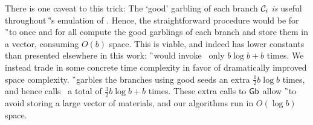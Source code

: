 There is one caveat to this trick:
The `good' garbling of each branch $\mathcal C_i$ \emph{is} useful throughout \G's
emulation of \E.
Hence, the straightforward procedure would be for \G\ to once and for
all compute the good garblings of each branch and store them in a
vector, consuming $O(b)$ space.
%
This is viable, and indeed has lower constants than presented
elsewhere in this work: \G\ would invoke \gGb\ only $b \log b + b$ times.
%
We instead trade in some concrete time complexity in favor of
dramatically improved space complexity.
\G\ garbles the branches using good seeds an extra $\frac{1}{2} b\log
b$ times, and hence calls \gGb\ a total of $\frac{3}{2} b \log b + b$
times.
These extra calls to $\textsf{Gb}$ allow \G\ to avoid storing a large vector
of materials, and our algorithms run in $O(\log b)$ space.

